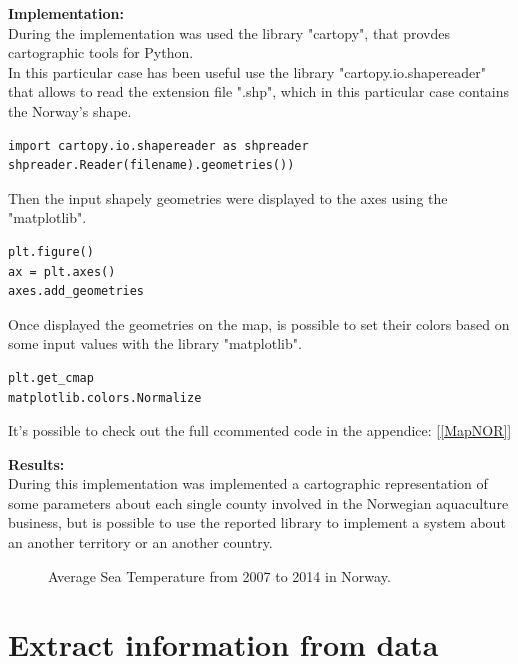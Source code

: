 \textbf{Implementation:}\\
During the implementation was used the library "cartopy", that provdes cartographic tools for Python. \\
In this particular case has been useful use the library "cartopy.io.shapereader" that allows to read the extension file ".shp", which in this particular case contains the Norway's shape.
\begin{lstlisting}
import cartopy.io.shapereader as shpreader
shpreader.Reader(filename).geometries())
\end{lstlisting}

Then the input shapely geometries were displayed  to the axes using the "matplotlib".
\begin{lstlisting}
plt.figure()
ax = plt.axes()
axes.add_geometries
\end{lstlisting}

Once displayed the geometries on the map, is possible to set their colors based on some input values with the library "matplotlib".
\begin{lstlisting}
plt.get_cmap
matplotlib.colors.Normalize
\end{lstlisting}

It's possible to check out the full ccommented code in the appendice: [\ref{MapNOR}]

\textbf{Results:} \\
During this implementation was implemented a cartographic representation of some parameters about each single county involved in the Norwegian aquaculture business, but is possible to use the reported library to implement a system about an another territory or an another country.
\begin{figure}[H]
    \caption{Average Sea Temperature from 2007 to 2014 in Norway.}
\end{figure}

\newpage

\section{Extract information from data}

